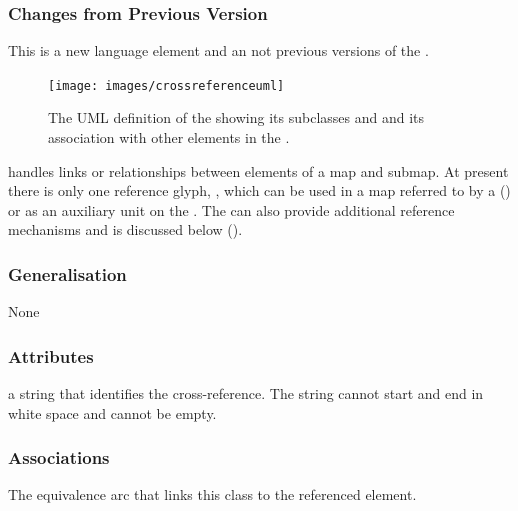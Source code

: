 \subsubsection{Changes from Previous Version}

This is a new language element and an not previous versions of the \PDl.


\label{defn:CrossReference}

\begin{figure}[htb]
  \centering
  \texttt{[image: images/crossreferenceuml]}
  \caption{The UML definition of the  showing
    its subclasses  and  and
    its association with other elements in the \PDl.}
  \label{fig:techref:crossreferenceuml}
\end{figure}


 handles links or relationships between elements of a
map and submap. At present there is only one reference glyph,
, which can be used in a map referred to by a 
() or as an auxiliary unit on the . The
 can also provide additional reference mechanisms
and is discussed below ().

\subsubsection{Generalisation}

None

\subsubsection{Attributes}

\begin{attributes}
   a string that identifies the
  cross-reference. The string cannot start and end in white space and
  cannot be empty.
\end{attributes}

\subsubsection{Associations}

\begin{attributes}
   The
  equivalence arc that links this class to the referenced element.
\end{attributes}

